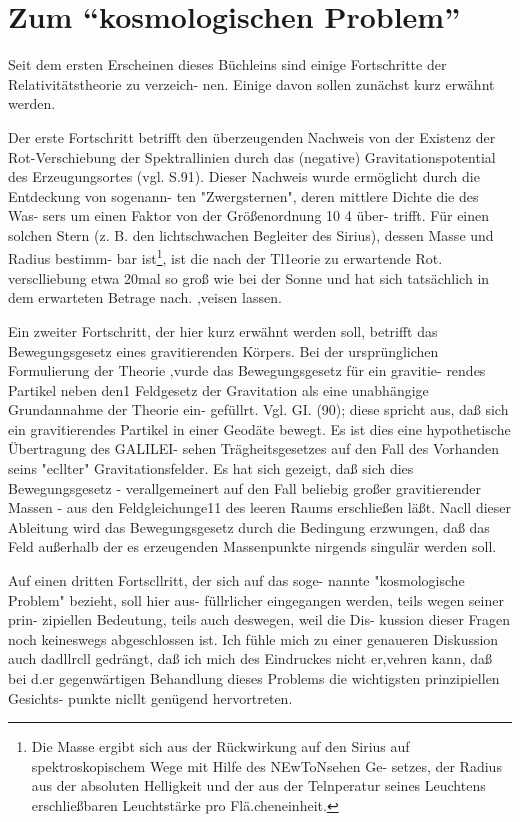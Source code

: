 %
%

\section{%
Zum \enquote{kosmologischen Problem}}
\label{sec:anh-1}

Seit dem ersten Erscheinen dieses Büchleins sind
einige Fortschritte der Relativitätstheorie zu verzeich-
nen. Einige davon sollen zunächst kurz erwähnt werden.

Der erste Fortschritt betrifft den überzeugenden
Nachweis von der Existenz der Rot-Verschiebung der
Spektrallinien durch das (negative) Gravitationspotential
des Erzeugungsortes (vgl. S.91). Dieser Nachweis
wurde ermöglicht durch die Entdeckung von sogenann-
ten "Zwergsternen", deren mittlere Dichte die des Was-
sers um einen Faktor von der Größenordnung 10 4 über-
trifft. Für einen solchen Stern (z. B. den lichtschwachen
Begleiter des Sirius), dessen Masse und Radius bestimm-
bar ist\footnote{Die Masse ergibt sich aus der Rückwirkung auf den Sirius
auf spektroskopischem Wege mit Hilfe des NEwToNsehen Ge-
setzes, der Radius aus der absoluten Helligkeit und der aus der
Telnperatur seines Leuchtens erschließbaren Leuchtstärke pro
Flä.cheneinheit.}, ist die nach der Tl1eorie zu erwartende Rot.
versclliebung etwa 20mal so groß wie bei der Sonne und
hat sich tatsächlich in dem erwarteten Betrage nach.
,veisen lassen.

Ein zweiter Fortschritt, der hier kurz erwähnt werden
soll, betrifft das Bewegungsgesetz eines gravitierenden
Körpers. Bei der ursprünglichen Formulierung der
Theorie ,vurde das Bewegungsgesetz für ein gravitie-
rendes Partikel neben den1 Feldgesetz der Gravitation
als eine unabhängige Grundannahme der Theorie ein-
gefüllrt. Vgl. GI. (90); diese spricht aus, daß sich ein
gravitierendes Partikel in einer Geodäte bewegt. Es
ist dies eine hypothetische Übertragung des GALILEI-
sehen Trägheitsgesetzes auf den Fall des Vorhanden seins
"ecllter" Gravitationsfelder. Es hat sich gezeigt, daß
sich dies Bewegungsgesetz - verallgemeinert auf den
Fall beliebig großer gravitierender Massen - aus den
Feldgleichunge11 des leeren Raums erschließen läßt.
Nacll dieser Ableitung wird das Bewegungsgesetz durch
die Bedingung erzwungen, daß das Feld außerhalb der
es erzeugenden Massenpunkte nirgends singulär werden
soll.

Auf einen dritten Fortscllritt, der sich auf das soge-
nannte "kosmologische Problem" bezieht, soll hier aus-
füllrlicher eingegangen werden, teils wegen seiner prin-
zipiellen Bedeutung, teils auch deswegen, weil die Dis-
kussion dieser Fragen noch keineswegs abgeschlossen
ist. Ich fühle mich zu einer genaueren Diskussion auch
dadllrcll gedrängt, daß ich mich des Eindruckes nicht
er,vehren kann, daß bei d.er gegenwärtigen Behandlung
dieses Problems die wichtigsten prinzipiellen Gesichts-
punkte nicllt genügend hervortreten.

